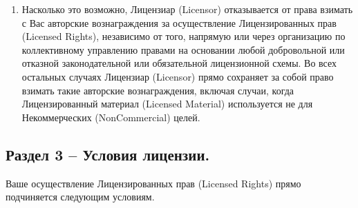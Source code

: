 \begin{itemize}
\begin{enumerate}
	\item Насколько это возможно, Лицензиар (Licensor) отказывается от права взимать с Вас авторские вознаграждения за осуществление Лицензированных прав (Licensed Rights), независимо от того, напрямую или через организацию по коллективному управлению правами на основании любой добровольной или отказной законодательной или обязательной лицензионной схемы. Во всех остальных случаях Лицензиар (Licensor) прямо сохраняет за собой право взимать такие авторские вознаграждения, включая случаи, когда Лицензированный материал (Licensed Material) используется не для Некоммерческих (NonCommercial) целей.
	\end{enumerate}
\end{itemize}

\subsection*{Раздел 3 -- Условия лицензии.}
Ваше осуществление Лицензированных прав (Licensed Rights) прямо подчиняется следующим условиям.
